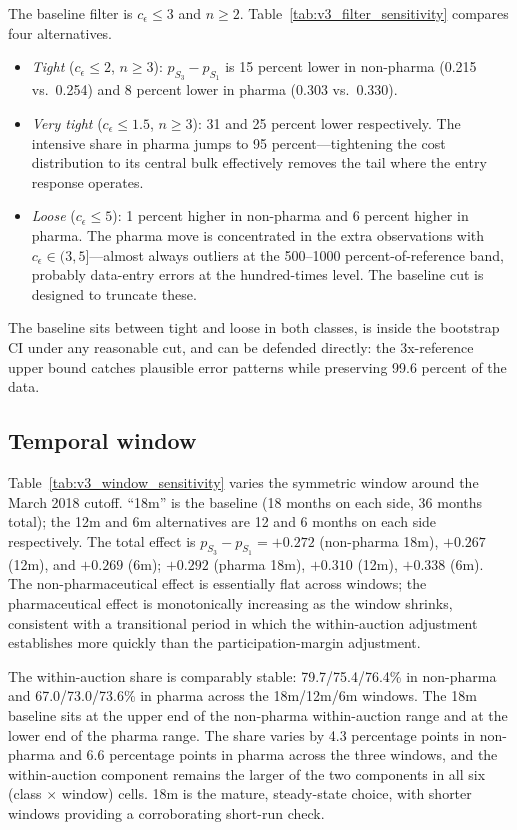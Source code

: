 The baseline filter is $c_\epsilon \le 3$ and $n \ge 2$. Table~\ref{tab:v3_filter_sensitivity} compares four alternatives.
\begin{itemize}
\item \emph{Tight} ($c_\epsilon \le 2$, $n \ge 3$): $p_{S_3} - p_{S_1}$ is 15 percent lower in non-pharma (0.215 vs.\ 0.254) and 8 percent lower in pharma (0.303 vs.\ 0.330).
\item \emph{Very tight} ($c_\epsilon \le 1.5$, $n \ge 3$): 31 and 25 percent lower respectively. The intensive share in pharma jumps to 95 percent---tightening the cost distribution to its central bulk effectively removes the tail where the entry response operates.
\item \emph{Loose} ($c_\epsilon \le 5$): 1 percent higher in non-pharma and 6 percent higher in pharma. The pharma move is concentrated in the extra observations with $c_\epsilon \in (3, 5]$---almost always outliers at the 500--1000 percent-of-reference band, probably data-entry errors at the hundred-times level. The baseline cut is designed to truncate these.
\end{itemize}
The baseline sits between tight and loose in both classes, is inside the bootstrap CI under any reasonable cut, and can be defended directly: the 3x-reference upper bound catches plausible error patterns while preserving 99.6 percent of the data.

\subsection{Temporal window}

Table~\ref{tab:v3_window_sensitivity} varies the symmetric window around the March 2018 cutoff. ``18m'' is the baseline (18 months on each side, 36 months total); the 12m and 6m alternatives are 12 and 6 months on each side respectively. The total effect is $p_{S_3} - p_{S_1} = +0.272$ (non-pharma 18m), $+0.267$ (12m), and $+0.269$ (6m); $+0.292$ (pharma 18m), $+0.310$ (12m), $+0.338$ (6m). The non-pharmaceutical effect is essentially flat across windows; the pharmaceutical effect is monotonically increasing as the window shrinks, consistent with a transitional period in which the within-auction adjustment establishes more quickly than the participation-margin adjustment.

The within-auction share is comparably stable: 79.7/75.4/76.4\% in non-pharma and 67.0/73.0/73.6\% in pharma across the 18m/12m/6m windows. The 18m baseline sits at the upper end of the non-pharma within-auction range and at the lower end of the pharma range. The share varies by 4.3 percentage points in non-pharma and 6.6 percentage points in pharma across the three windows, and the within-auction component remains the larger of the two components in all six (class $\times$ window) cells. 18m is the mature, steady-state choice, with shorter windows providing a corroborating short-run check.

